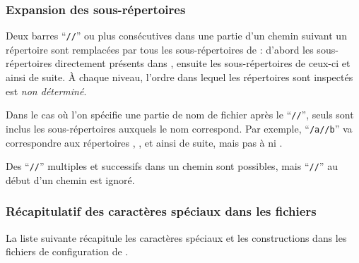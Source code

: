 \documentclass[german, english, french, 12pt]{article}
\renewcommand{\samp}[1]{\enquote{\texttt{#1}}}
\begin{document}
\subsubsection{Expansion des sous-répertoires}
\label{sec:subdirectory-expansion}

Deux barres \samp{//} ou plus consécutives dans une partie d'un chemin suivant
un répertoire  sont remplacées par tous les sous-répertoires de  :
d'abord les sous-répertoires directement présents dans , ensuite les
sous-répertoires de ceux-ci et ainsi de suite. À chaque niveau, l'ordre dans
lequel les répertoires sont inspectés est \emph{non déterminé}.

Dans le cas où l'on spécifie une partie de nom de fichier après le \samp{//},
seuls sont inclus les sous-répertoires auxquels le nom correspond. Par exemple,
\samp{/a//b} va correspondre aux répertoires , ,
 et ainsi de suite, mais pas à  ni .

Des \samp{//} multiples et successifs dans un chemin sont possibles, mais
\samp{//} au début d'un chemin est ignoré.

\subsubsection{Récapitulatif des caractères spéciaux dans les fichiers
  }
\label{sec:cnf-special-chars}

La liste suivante récapitule les caractères spéciaux et les constructions dans
les fichiers de configuration de \KPS{}.

\newcommand{\CODE}[1]{\makebox[3em][l]{\code{#1}}}
\end{document}
